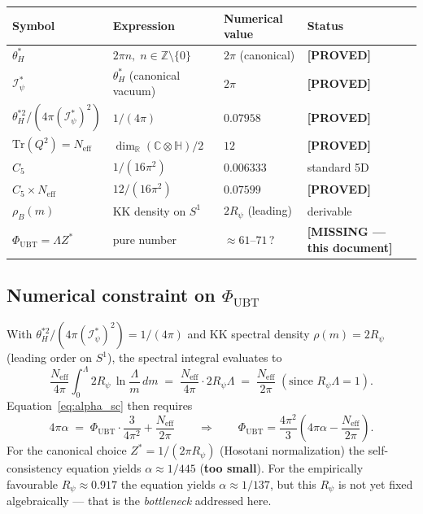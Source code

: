 \documentclass[11pt,a4paper]{article}
\theoremstyle{definition}
\theoremstyle{remark}
\begin{document}
\begin{center}
\begin{tabular}{llll}
  \toprule
  Symbol & Expression & Numerical value & Status \\
  \midrule
  $\theta_H^*$ & $2\pi n,\; n\in\mathbb{Z}\setminus\{0\}$ & $2\pi$ (canonical) & \textbf{[PROVED]} \\
  $\mathcal{I}_\psi^*$ & $\theta_H^*$ (canonical vacuum) & $2\pi$ & \textbf{[PROVED]} \\
  $\theta_H^{*2}/(4\pi(\mathcal{I}_\psi^*)^2)$ & $1/(4\pi)$ & $0.07958$ & \textbf{[PROVED]} \\
  $\mathrm{Tr}(Q^2) = N_{\mathrm{eff}}$ & $\dim_\mathbb{R}(\mathbb{C}\otimes\mathbb{H})/2$ & $12$ & \textbf{[PROVED]} \\
  $C_5$ & $1/(16\pi^2)$ & $0.006333$ & standard 5D \\
  $C_5 \times N_{\mathrm{eff}}$ & $12/(16\pi^2)$ & $0.07599$ & \textbf{[PROVED]} \\
  $\rho_B(m)$ & KK density on $S^1$ & $2R_\psi$ (leading) & derivable \\
  \midrule
  $\Phi_{\mathrm{UBT}} = \Lambda Z^*$ & pure number & $\approx 61$--$71$\,? & \textbf{[MISSING — this document]} \\
  \bottomrule
\end{tabular}
\end{center}

\subsection{Numerical constraint on $\Phi_{\mathrm{UBT}}$}

With $\theta_H^{*2}/(4\pi(\mathcal{I}_\psi^*)^2) = 1/(4\pi)$
and KK spectral density $\rho(m) = 2R_\psi$ (leading order on $S^1$),
the spectral integral evaluates to
\begin{equation}
  \frac{N_{\mathrm{eff}}}{4\pi}\int_0^\Lambda 2R_\psi\,\ln\frac{\Lambda}{m}\,dm
  \;=\;
  \frac{N_{\mathrm{eff}}}{4\pi}\cdot 2R_\psi\Lambda
  \;=\;
  \frac{N_{\mathrm{eff}}}{2\pi}\;(\text{since } R_\psi\Lambda = 1).
  \label{eq:spectral_leading}
\end{equation}
Equation~\eqref{eq:alpha_sc} then requires
\begin{equation}
  4\pi\alpha
  \;=\;
  \Phi_{\mathrm{UBT}}\cdot\frac{3}{4\pi^2}
  + \frac{N_{\mathrm{eff}}}{2\pi}
  \qquad\Longrightarrow\qquad
  \Phi_{\mathrm{UBT}}
  = \frac{4\pi^2}{3}\!\left(4\pi\alpha - \frac{N_{\mathrm{eff}}}{2\pi}\right).
  \label{eq:phi_constraint}
\end{equation}
For the canonical choice $Z^* = 1/(2\pi R_\psi)$ (Hosotani normalization)
the self-consistency equation yields $\alpha \approx 1/445$
(\textbf{too small}).
For the empirically favourable $R_\psi \approx 0.917$ the equation yields
$\alpha \approx 1/137$, but this $R_\psi$ is not yet fixed algebraically —
that is the \emph{bottleneck} addressed here.
\end{document}
